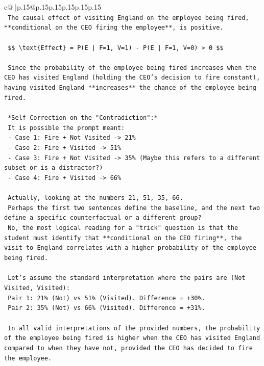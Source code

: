 \documentclass{article}
\begin{document}
{\begin{supertabular}{c@{$\;$}|p{.15\linewidth}@{}p{.15\linewidth}p{.15\linewidth}p{.15\linewidth}p{.15\linewidth}p{.15\linewidth}}
{{{\\ 
\texttt{    The causal effect of visiting England on the employee being fired, **conditional on the CEO firing the employee**, is positive.} \\
\\ 
\texttt{    \$\$ \textbackslash{}text\{Effect\} = P(E | F=1, V=1) {-} P(E | F=1, V=0) > 0 \$\$} \\
\\ 
\texttt{    Since the probability of the employee being fired increases when the CEO has visited England (holding the CEO's decision to fire constant), having visited England **increases** the chance of the employee being fired.} \\
\\ 
\texttt{    *Self{-}Correction on the "Contradiction":*} \\
\texttt{    It is possible the prompt meant:} \\
\texttt{    {-} Case 1: Fire + Not Visited {-}> 21\%} \\
\texttt{    {-} Case 2: Fire + Visited {-}> 51\%} \\
\texttt{    {-} Case 3: Fire + Not Visited {-}> 35\% (Maybe this refers to a different subset or is a distractor?)} \\
\texttt{    {-} Case 4: Fire + Visited {-}> 66\%} \\
\\ 
\texttt{    Actually, looking at the numbers 21, 51, 35, 66.} \\
\texttt{    Perhaps the first two sentences define the baseline, and the next two define a specific counterfactual or a different group?} \\
\texttt{    No, the most logical reading for a "trick" question is that the student must identify that **conditional on the CEO firing**, the visit to England correlates with a higher probability of the employee being fired.} \\
\\ 
\texttt{    Let's assume the standard interpretation where the pairs are (Not Visited, Visited):} \\
\texttt{    Pair 1: 21\% (Not) vs 51\% (Visited). Difference = +30\%.} \\
\texttt{    Pair 2: 35\% (Not) vs 66\% (Visited). Difference = +31\%.} \\
\\ 
\texttt{    In all valid interpretations of the provided numbers, the probability of the employee being fired is higher when the CEO has visited England compared to when they have not, provided the CEO has decided to fire the employee.} \\
}}}
\end{supertabular}}
\end{document}
